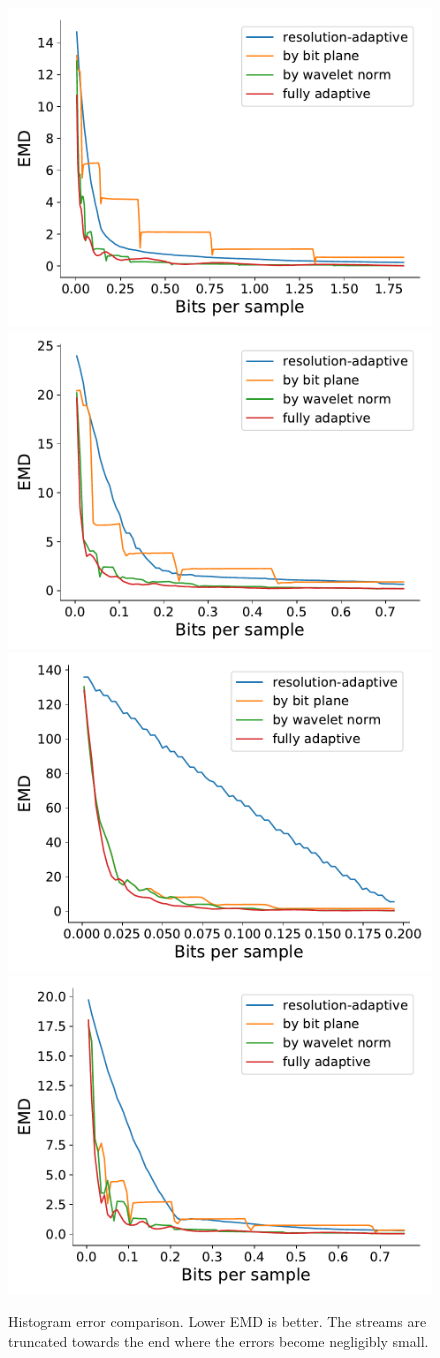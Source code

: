 \begin{figure}
	\centering
	{\includegraphics[width=0.44\linewidth]{img/motivation/magnetic-histogram-motivation.pdf}}
	{\includegraphics[width=0.44\linewidth]{img/motivation/boiler-histogram-motivation.pdf}}
	{\includegraphics[width=0.44\linewidth]{img/motivation/kflame-oh-histogram-motivation.pdf}}
	{\includegraphics[width=0.44\linewidth]{img/motivation/diffusivity-histogram-motivation.pdf}}
	\caption{Histogram error comparison. Lower EMD is better. The streams are truncated	towards the
	end where the errors become negligibly small.}
	\label{fig:histogram-motivation}
\end{figure}

